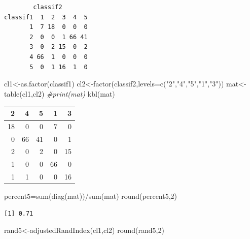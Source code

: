 \documentclass[
  11pt,
]{article}
\newenvironment{Shaded}{\begin{snugshade}}{\end{snugshade}}
\newcommand{\AttributeTok}[1]{\textcolor[rgb]{0.77,0.63,0.00}{#1}}
\newcommand{\CommentTok}[1]{\textcolor[rgb]{0.56,0.35,0.01}{\textit{#1}}}
\newcommand{\DecValTok}[1]{\textcolor[rgb]{0.00,0.00,0.81}{#1}}
\newcommand{\FunctionTok}[1]{\textcolor[rgb]{0.00,0.00,0.00}{#1}}
\newcommand{\NormalTok}[1]{#1}
\newcommand{\OtherTok}[1]{\textcolor[rgb]{0.56,0.35,0.01}{#1}}
\newcommand{\SpecialCharTok}[1]{\textcolor[rgb]{0.00,0.00,0.00}{#1}}
\newcommand{\StringTok}[1]{\textcolor[rgb]{0.31,0.60,0.02}{#1}}
\begin{document}
\begin{verbatim}
        classif2
classif1  1  2  3  4  5
       1  7 18  0  0  0
       2  0  0  1 66 41
       3  0  2 15  0  2
       4 66  1  0  0  0
       5  0  1 16  1  0
\end{verbatim}

\begin{Shaded}
\begin{Highlighting}[]
\NormalTok{cl1}\OtherTok{\textless{}{-}}\FunctionTok{as.factor}\NormalTok{(classif1)}
\NormalTok{cl2}\OtherTok{\textless{}{-}}\FunctionTok{factor}\NormalTok{(classif2,}\AttributeTok{levels=}\FunctionTok{c}\NormalTok{(}\StringTok{"2"}\NormalTok{,}\StringTok{"4"}\NormalTok{,}\StringTok{"5"}\NormalTok{,}\StringTok{"1"}\NormalTok{,}\StringTok{"3"}\NormalTok{))}
\NormalTok{mat}\OtherTok{\textless{}{-}}\FunctionTok{table}\NormalTok{(cl1,cl2)}
\CommentTok{\#print(mat)}
\FunctionTok{kbl}\NormalTok{(mat)}
\end{Highlighting}
\end{Shaded}

\begin{tabular}[t]{r|r|r|r|r}
\hline
2 & 4 & 5 & 1 & 3\\
\hline
18 & 0 & 0 & 7 & 0\\
\hline
0 & 66 & 41 & 0 & 1\\
\hline
2 & 0 & 2 & 0 & 15\\
\hline
1 & 0 & 0 & 66 & 0\\
\hline
1 & 1 & 0 & 0 & 16\\
\hline
\end{tabular}

\begin{Shaded}
\begin{Highlighting}[]
\NormalTok{percent5}\OtherTok{=}\FunctionTok{sum}\NormalTok{(}\FunctionTok{diag}\NormalTok{(mat))}\SpecialCharTok{/}\FunctionTok{sum}\NormalTok{(mat)}
\FunctionTok{round}\NormalTok{(percent5,}\DecValTok{2}\NormalTok{)}
\end{Highlighting}
\end{Shaded}

\begin{verbatim}
[1] 0.71
\end{verbatim}

\begin{Shaded}
\begin{Highlighting}[]
\NormalTok{rand5}\OtherTok{\textless{}{-}}\FunctionTok{adjustedRandIndex}\NormalTok{(cl1,cl2)}
\FunctionTok{round}\NormalTok{(rand5,}\DecValTok{2}\NormalTok{)}
\end{Highlighting}
\end{Shaded}
\end{document}
